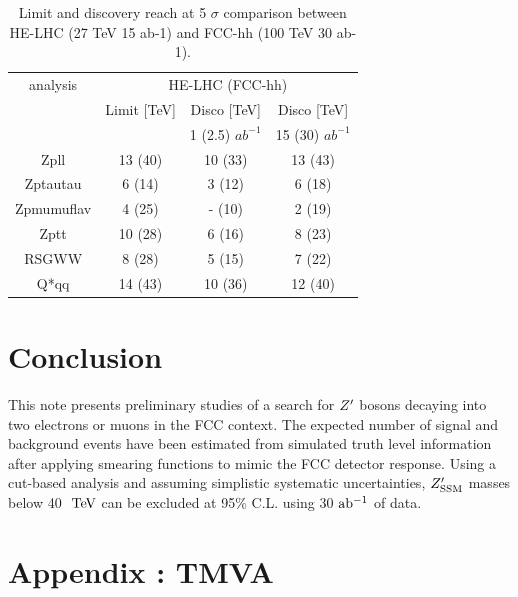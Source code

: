 \documentclass{cernrep}
\begin{document}
\begin{table}[!htb]\centering
\begin{tabular}{|c|c|c|c|}
\hline
\hline
analysis   & \multicolumn{3}{c|}{HE-LHC (FCC-hh)} \\
           & Limit [TeV] & Disco [TeV]   & Disco [TeV] \\
           &             & 1 (2.5) $ab^{-1}$ & 15 (30) $ab^{-1}$ \\
\hline
Zpll       & 13 (40) & 10 (33) & 13 (43) \\
Zptautau   &  6 (14) &  3 (12) &  6 (18) \\
Zpmumuflav &  4 (25) &  - (10) &  2 (19) \\
Zptt       & 10 (28) &  6 (16) &  8 (23) \\
RSGWW      &  8 (28) &  5 (15) &  7 (22) \\
Q*qq       & 14 (43) & 10 (36) & 12 (40) \\
\hline
\hline
\end{tabular}
\caption{Limit and discovery reach at 5 $\sigma$ comparison between HE-LHC (27 TeV 15 ab-1) and FCC-hh (100 TeV 30 ab-1).}
\label{tab:27vs100}
\end{table}


\section{Conclusion}
This note presents preliminary studies of a search for $Z^{\prime}$ 
bosons decaying into two electrons or muons in the FCC context. The expected number 
of signal and background events have been estimated from simulated truth level information 
after applying smearing functions to mimic the FCC detector response.
Using a cut-based analysis and assuming simplistic systematic uncertainties, $Z^{\prime}_{\mathrm{SSM}}$
masses below 40 $\TeV$ can be excluded at 95$\%$ C.L. 
using 30 $\mbox{ab$^{-1}$}{}$ of data. 
\clearpage
\newpage

\appendix

\section{ Appendix : TMVA}
\label{appendix:tmva}
\end{document}
